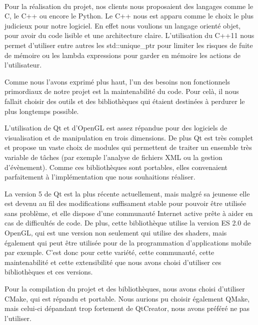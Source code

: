 \paragraph{}
        Pour la réalisation du projet, nos clients nous proposaient des langages comme le C, le C++ ou encore le Python. Le C++ nous est apparu comme le choix le plus judicieux pour notre logiciel. En effet nous voulions un langage orienté objet, pour avoir du code lisible et une architecture claire. L'utilisation du C++11 nous permet d'utiliser entre autres les std::unique\_ptr pour limiter les risques de fuite de mémoire ou les lambda expressions pour garder en mémoire les actions de l'utilisateur.

    Comme nous l'avons exprimé plus haut, l'un des besoins non fonctionnels primordiaux de notre projet est la maintenabilité du code. Pour celà, il nous fallait choisir des outils et des bibliothèques qui étaient destinées à perdurer le plus longtemps possible.
    
    L'utilisation de Qt et d'OpenGL est assez répandue pour des logiciels de visualisation et de manipulation en trois dimensions. De plus Qt est très complet et propose un vaste choix de modules qui permettent de traiter un ensemble très variable de tâches (par exemple l'analyse de fichiers XML ou la gestion d'évènement). Comme ces bibliothèques sont portables, elles convenaient parfaitement à l'implémentation que nous souhaitions réaliser.
    
    La version 5 de Qt est la plus récente actuellement, mais malgré sa jeunesse elle est devenu au fil des modifications suffisament stable pour pouvoir être utilisée sans problème, et elle dispose d'une communauté Internet active prête à aider en cas de difficultés de code. De plus, cette bibliothèque utilise la version ES 2.0 de OpenGL, qui est une version non seulement qui utilise des shaders, mais également qui peut être utilisée pour de la programmation d'applications mobile par exemple. C'est donc pour cette variété, cette communauté, cette maintenabilité et cette extensibilité que nous avons choisi d'utiliser ces bibliothèques et ces versions.

    Pour la compilation du projet et des bibliothèques, nous avons choisi d'utiliser CMake, qui est répandu et portable. Nous aurions pu choisir également QMake, mais celui-ci dépandant trop fortement de QtCreator, nous avons préféré ne pas l'utiliser.
